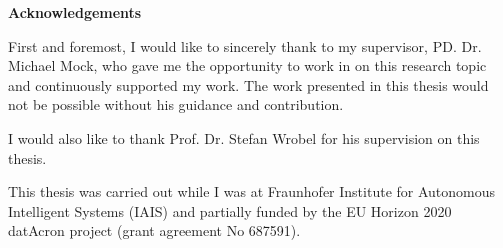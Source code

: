

	\thispagestyle{empty}
{\noindent%
	\huge{\textbf{\textsf{Acknowledgements}}}
}
\vspace{2cm}
\begin{flushleft}
	\noindent%
	First and foremost, I would like to sincerely thank to my supervisor, PD. Dr. Michael Mock, who gave me the opportunity to work in on this research topic and continuously supported my work. The work presented in this thesis would not be possible without his guidance and contribution.
	
	 I would also like to thank Prof. Dr. Stefan Wrobel for his supervision on this thesis.  

This thesis was carried out while I was at Fraunhofer Institute for Autonomous Intelligent Systems (IAIS) and  partially funded by the EU Horizon 2020 datAcron project (grant agreement No 687591).
	
	
\end{flushleft}
